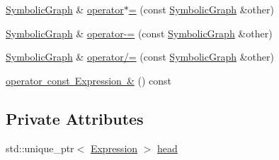 \begin{DoxyCompactItemize}
\mbox{\hyperlink{classsymcpp_1_1SymbolicGraph}{Symbolic\+Graph}} \& \mbox{\hyperlink{classsymcpp_1_1SymbolicGraph_ad3ba7327225f323e98a0db4a78434d18}{operator$\ast$=}} (const \mbox{\hyperlink{classsymcpp_1_1SymbolicGraph}{Symbolic\+Graph}} \&other)
\item 
\mbox{\hyperlink{classsymcpp_1_1SymbolicGraph}{Symbolic\+Graph}} \& \mbox{\hyperlink{classsymcpp_1_1SymbolicGraph_a190dea96dae8a94610f070364f50a238}{operator-\/=}} (const \mbox{\hyperlink{classsymcpp_1_1SymbolicGraph}{Symbolic\+Graph}} \&other)
\item 
\mbox{\hyperlink{classsymcpp_1_1SymbolicGraph}{Symbolic\+Graph}} \& \mbox{\hyperlink{classsymcpp_1_1SymbolicGraph_a5fc368abfd149228c614d63fd8ead1a0}{operator/=}} (const \mbox{\hyperlink{classsymcpp_1_1SymbolicGraph}{Symbolic\+Graph}} \&other)
\item 
\mbox{\hyperlink{classsymcpp_1_1SymbolicGraph_a77b9c5dd5ebc737b6a60aa49996b37b3}{operator const Expression \&}} () const
\end{DoxyCompactItemize}
\subsection*{Private Attributes}
\begin{DoxyCompactItemize}
\item 
std\+::unique\+\_\+ptr$<$ \mbox{\hyperlink{classsymcpp_1_1Expression}{Expression}} $>$ \mbox{\hyperlink{classsymcpp_1_1SymbolicGraph_af7dd748252d7298792ff6329036de642}{head}}
\end{DoxyCompactItemize}
